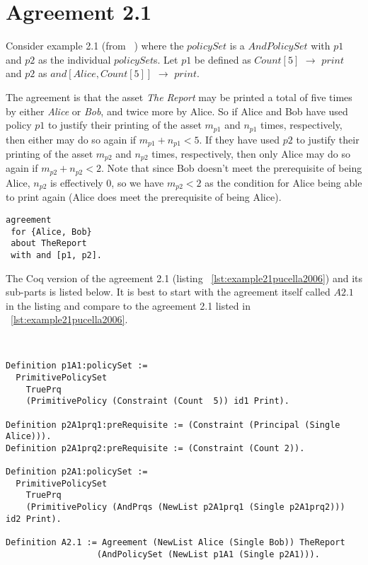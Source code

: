 \section{Agreement 2.1}

Consider example 2.1 (from ~\cite{pucella2006}) where the $policySet$ is a $AndPolicySet$ with $p1$ and $p2$ as the individual $policySet$s. Let $p1$ be defined as $Count[5]$ $\rightarrow$ $print$ and $p2$ as $and[Alice, Count[5]]$ $\rightarrow$ $print$. 

The agreement is that the asset \emph{The Report} may be printed a total of five times by either \emph{Alice} or \emph{Bob}, and twice more by Alice. So if Alice and Bob have used policy $p1$ to justify their printing of the asset $m_{p1}$ and $n_{p1}$ times, respectively, then either may do so again if $m_{p1} + n_{p1} < 5$. If they have used $p2$ to justify their printing of the asset $m_{p2}$ and $n_{p2}$ times, respectively, then only Alice may do so again if $m_{p2} + n_{p2} < 2$. Note that since Bob doesn't meet the prerequisite of being Alice, $n_{p2}$ is effectively $0$, so we have $m_{p2} < 2$ as the condition for Alice being able to print again (Alice does meet the prerequisite of being Alice).

\lstset{language=Pucella2006}
\begin{lstlisting}[frame=single, caption={Agreement 2.1 (as used in ~\cite{pucella2006})},label={lst:example21pucella2006}]
agreement
 for {Alice, Bob} 
 about TheReport 
 with and [p1, p2].
\end{lstlisting}

The Coq version of the agreement 2.1 (listing ~\ref{lst:example21pucella2006}) and its sub-parts is listed below. It is best to start with the agreement itself called $A2.1$ in the listing and compare to the agreement 2.1 listed in ~\ref{lst:example21pucella2006}.

\lstset{language=Coq}
\begin{minipage}[c]{0.95\textwidth}
\begin{lstlisting}[frame=single, caption={Agreement 2.1 in Coq},label={lst:example21}]


Definition p1A1:policySet :=
  PrimitivePolicySet
    TruePrq
    (PrimitivePolicy (Constraint (Count  5)) id1 Print).

Definition p2A1prq1:preRequisite := (Constraint (Principal (Single Alice))).
Definition p2A1prq2:preRequisite := (Constraint (Count 2)).

Definition p2A1:policySet :=
  PrimitivePolicySet
    TruePrq
    (PrimitivePolicy (AndPrqs (NewList p2A1prq1 (Single p2A1prq2))) id2 Print).

Definition A2.1 := Agreement (NewList Alice (Single Bob)) TheReport
                  (AndPolicySet (NewList p1A1 (Single p2A1))).

\end{lstlisting}                  
\end{minipage}

